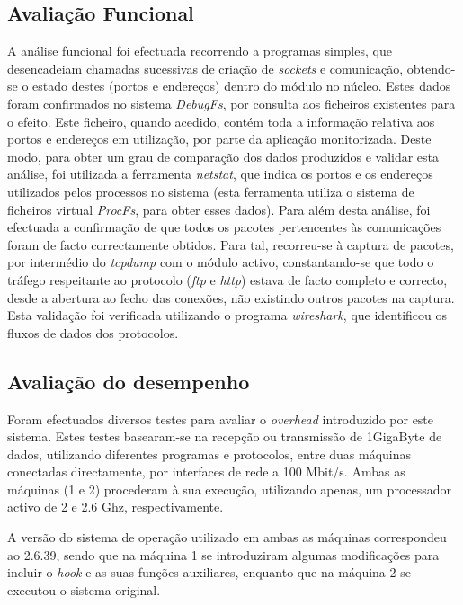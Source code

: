 \subsection{Avaliação Funcional}
\label{sub:eval_functional}
A análise funcional foi efectuada recorrendo a programas simples, que desencadeiam chamadas sucessivas de criação de \textit{sockets} e comunicação, obtendo-se o estado destes (portos e endereços) dentro do módulo no núcleo.
Estes dados foram confirmados no sistema \textit{DebugFs}, por consulta aos ficheiros existentes para o efeito.
Este ficheiro, quando acedido, contém toda a informação relativa aos portos e endereços em utilização, por parte da aplicação monitorizada.
Deste modo, para obter um grau de comparação dos dados produzidos e validar esta análise, foi utilizada a ferramenta \textit{netstat}, que indica os portos e os endereços utilizados pelos processos no sistema (esta ferramenta utiliza o sistema de ficheiros virtual \textit{ProcFs}, para obter esses dados).
Para além desta análise, foi efectuada a confirmação de que todos os pacotes pertencentes às comunicações foram de facto correctamente obtidos.
Para tal, recorreu-se à captura de pacotes, por intermédio do \textit{tcpdump} com o módulo activo, constantando-se que todo o tráfego respeitante ao protocolo (\textit{ftp} e \textit{http}) estava de facto completo e correcto, desde a abertura ao fecho das conexões, não existindo outros pacotes na captura.
Esta validação foi verificada utilizando o programa \textit{wireshark}, que identificou os fluxos de dados dos protocolos.

\subsection{Avaliação do desempenho}
\label{sub:eval_performance}
Foram efectuados diversos testes para avaliar o \emph{overhead} introduzido por este sistema.
Estes testes basearam-se na recepção ou transmissão de 1GigaByte de dados, utilizando diferentes programas e protocolos, entre duas máquinas conectadas directamente, por interfaces de rede a 100 Mbit/s.
Ambas as máquinas (1 e 2) procederam à sua execução, utilizando apenas, um processador activo de 2 e 2.6 Ghz, respectivamente.

A versão do sistema de operação utilizado em ambas as máquinas correspondeu ao 2.6.39, sendo que na máquina 1 se introduziram algumas modificações para incluir o \textit{hook} e as suas funções auxiliares, enquanto que na máquina 2 se executou o sistema original.

